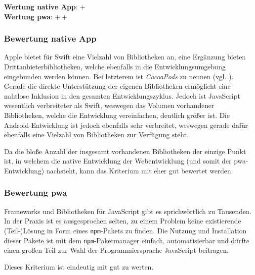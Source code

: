 \textbf{Wertung native App}: $+$ \\
\textbf{Wertung \ac{pwa}}: $++$

\subsubsection{Bewertung native App}
Apple bietet für Swift eine Vielzahl von Bibliotheken an, eine Ergänzung bieten Drittanbieterbibliotheken, welche ebenfalls in die Entwicklungsumgebung eingebunden werden können. Bei letzterem ist \textit{CocoaPods} zu nennen (vgl. \cite{CocoaPods}). Gerade die direkte Unterstützung der eigenen Bibliotheken ermöglicht eine nahtlose Inklusion in den gesamten Entwicklungszyklus. Jedoch ist JavaScript wesentlich verbreiteter als Swift, weswegen das Volumen vorhandener Bibliotheken, welche die Entwicklung vereinfachen, deutlich größer ist. Die Android-Entwicklung ist jedoch ebenfalls sehr verbreitet, weswegen gerade dafür ebenfalls eine Vielzahl von Bibliotheken zur Verfügung steht.

Da die bloße Anzahl der insgesamt vorhandenen Bibliotheken der einzige Punkt ist, in welchem die native Entwicklung der Webentwicklung (und somit der \ac{pwa}-Entwicklung) nachsteht, kann das Kriterium mit eher gut bewertet werden.

\subsubsection{Bewertung \ac{pwa}}
Frameworks und Bibliotheken für JavaScript gibt es sprichwörtlich zu Tausenden. In der Praxis ist es ausgesprochen selten, zu einem Problem keine existierende (Teil-)Lösung in Form eines \texttt{npm}-Pakets zu finden. Die Nutzung und Installation dieser Pakete ist mit dem \texttt{npm}-Paketmanager einfach, automatisierbar und dürfte einen großen Teil zur Wahl der Programmiersprache JavaScript beitragen.

Dieses Kriterium ist eindeutig mit gut zu werten.